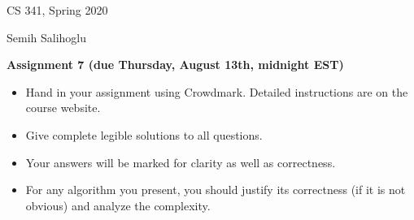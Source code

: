 \documentclass[11pt]{article}
\begin{document}
\hfill CS 341, Spring 2020\par
\hfill Semih Salihoglu

\bigskip
\begin{center}\large\bf Assignment 7 (due Thursday, August 13th, midnight EST)
\end{center}

\begin{itemize}
\item Hand in your assignment using Crowdmark. Detailed instructions are on the course website.
\item Give complete legible solutions to all questions.
\item Your answers will be marked for clarity as well as correctness.
\item For any algorithm you present, you should justify its correctness
(if it is not obvious) and analyze the complexity.
\end{itemize}
\end{document}

